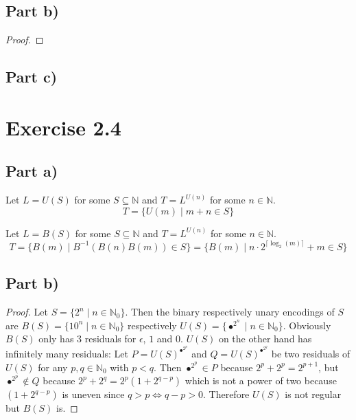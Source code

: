 \documentclass[10pt,a4paper]{article}
\begin{document}
\subsection*{Part b)}

\begin{proof}

\end{proof}

\subsection*{Part c)}

\section*{Exercise 2.4}

\subsection*{Part a)}

Let $L = U(S)$ for some $S \subseteq \mathbb{N}$ and $T = L^{U(n)}$ for some $n \in \mathbb{N}$.
\begin{equation*}
  T = \{ U(m) \mid m + n \in S \}
\end{equation*}

Let $L = B(S)$ for some $S \subseteq \mathbb{N}$ and $T = L^{U(n)}$ for some $n \in \mathbb{N}$.
\begin{equation*}
  T = \{ B(m) \mid B^{-1}(B(n) B(m)) \in S \} = \{ B(m) \mid n \cdot 2^{\lceil\log_{2}(m)\rceil} + m \in S \}
\end{equation*}

\subsection*{Part b)}

\begin{proof}
  Let $S = \{ 2^{n} \mid n \in \mathbb{N}_{0} \}$.
  Then the binary respectively unary encodings of $S$ are $B(S) = \{ 10^{n} \mid n \in \mathbb{N}_{0} \}$ respectively $U(S) = \{ \bullet^{2^{n}} \mid n \in \mathbb{N}_{0} \}$.
  Obviously $B(S)$ only has 3 residuals for $\epsilon$, $1$ and $0$.
  $U(S)$ on the other hand has infinitely many residuals:
  Let $P = U(S)^{\bullet^{2^{p}}}$ and $Q = U(S)^{\bullet^{2^{q}}}$ be two residuals of $U(S)$ for any $p, q \in \mathbb{N}_{0}$ with $p < q$.
  Then $\bullet^{2^{p}} \in P$ because $2^{p} + 2^{p} = 2^{p + 1}$, but $\bullet^{2^{p}} \not\in Q$ because $2^{p} + 2^{q} = 2^{p}(1 + 2^{q - p})$ which is not a power of two because $(1 + 2^{q - p})$ is uneven since $q > p \Leftrightarrow q - p > 0$.
  Therefore $U(S)$ is not regular but $B(S)$ is.
\end{proof}
\end{document}
